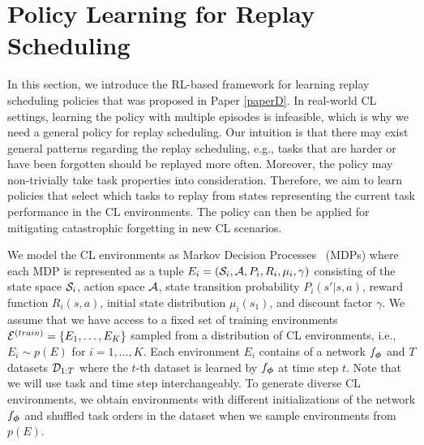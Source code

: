 \section{Policy Learning for Replay Scheduling}\label{chap4:sec:policy_learning_for_replay_scheduling}

In this section, we introduce the RL-based framework for learning replay scheduling policies that was proposed in Paper \ref{paperD}. In real-world CL settings, learning the policy with multiple episodes is infeasible, which is why we need a general policy for replay scheduling.
Our intuition is that there may exist general patterns regarding the replay scheduling, e.g., tasks that are harder or have been forgotten should be replayed more often. Moreover, the policy may non-trivially take task properties into consideration. Therefore, we aim to learn policies that select which tasks to replay from states representing the current task performance in the CL environments. The policy can then be applied for mitigating catastrophic forgetting in new CL scenarios. 

We model the CL environments as Markov Decision Processes~\cite{bellman1957markovian} (MDPs) where each MDP is represented as a tuple $E_i = ({\mathcal{S}}_i, {\mathcal{A}}, P_i, R_i, \mu_i, \gamma)$ consisting of the state space ${\mathcal{S}}_i$, action space ${\mathcal{A}}$, state transition probability $P_i(s' | s, a)$, reward function $R_i(s, a)$, initial state distribution $\mu_i(s_1)$, and discount factor $\gamma$.
We assume that we have access to a fixed set of training environments ${\mathcal{E}}^{(train)} = \{E_1, \dots, E_K\}$ sampled from a distribution of CL environments, i.e., $E_i \sim p(E)$ for $i=1, ..., K$. 
Each environment $E_i$ contains of a network $f_{{\bm{\phi}}}$ and $T$ datasets ${\mathcal{D}}_{1:T}$ where the $t$-th dataset is learned by $f_{{\bm{\phi}}}$ at time step $t$. Note that we will use task and time step interchangeably. 
To generate diverse CL environments, we obtain environments with different initializations of the network $f_{{\bm{\phi}}}$ and shuffled task orders in the dataset when we sample environments from $p(E)$. 


